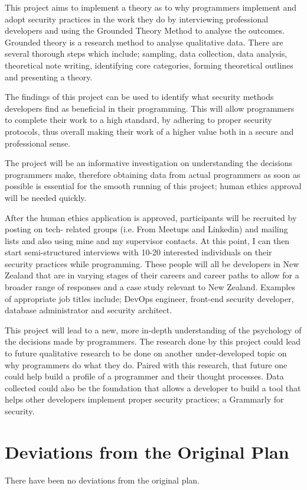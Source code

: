\par This project aims to implement a theory as to why programmers implement and adopt security practices in the work they do by interviewing professional developers and using the Grounded Theory Method to analyse the outcomes. Grounded theory is a research method to analyse qualitative data. There are several thorough steps which include; sampling, data collection, data analysis, theoretical note writing, identifying core categories, forming theoretical outlines and presenting a theory.
\newline
\par The findings of this project can be used to identify what security methods developers find as beneficial in their programming. This will allow programmers to complete their work to a high standard, by adhering to proper security protocols, thus overall making their work of a higher value both in a secure and professional sense.
\newline
\par The project will be an informative investigation on understanding the decisions programmers make, therefore obtaining data from actual programmers as soon as possible is essential for the smooth running of this project; human ethics approval will be needed quickly.
\newline
\par After the human ethics application is approved, participants will be recruited by posting on tech- related groups (i.e. From Meetups and Linkedin) and mailing lists and also using mine and my supervisor contacts. At this point, I can then start semi-structured interviews with 10-20 interested individuals on their security practices while programming. These people will all be developers in New Zealand that are in varying stages of their careers and career paths to allow for a broader range of responses and a case study relevant to New Zealand. Examples of appropriate job titles include; DevOps engineer, front-end security developer, database administrator and security architect.
\newline
\par This project will lead to a new, more in-depth understanding of the psychology of the decisions made by programmers. The research done by this project could lead to future qualitative research to be done on another under-developed topic on why programmers do what they do. Paired with this research, that future one could help build a profile of a programmer and their thought processes. Data collected could also be the foundation that allows a developer to build a tool that helps other developers implement proper security practices; a Grammarly for security.

\section{Deviations from the Original Plan}
There have been no deviations from the original plan.